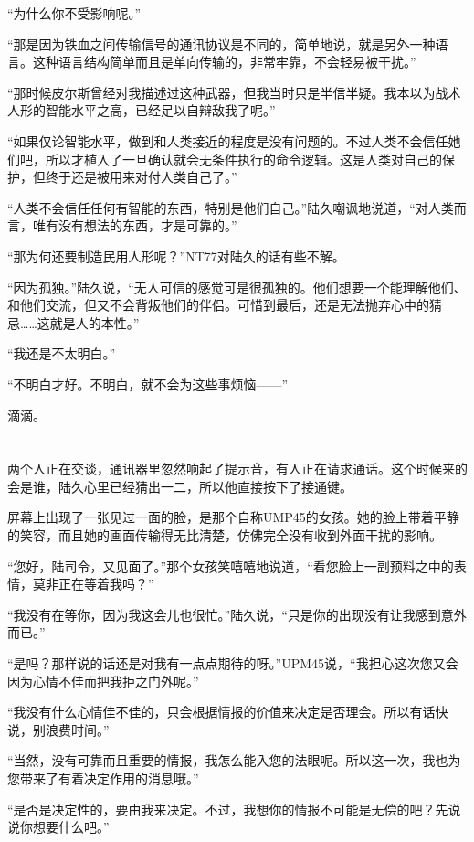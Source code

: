 “为什么你不受影响呢。”

“那是因为铁血之间传输信号的通讯协议是不同的，简单地说，就是另外一种语言。这种语言结构简单而且是单向传输的，非常牢靠，不会轻易被干扰。”

“那时候皮尔斯曾经对我描述过这种武器，但我当时只是半信半疑。我本以为战术人形的智能水平之高，已经足以自辩敌我了呢。”

“如果仅论智能水平，做到和人类接近的程度是没有问题的。不过人类不会信任她们吧，所以才植入了一旦确认就会无条件执行的命令逻辑。这是人类对自己的保护，但终于还是被用来对付人类自己了。”

“人类不会信任任何有智能的东西，特别是他们自己。”陆久嘲讽地说道，“对人类而言，唯有没有想法的东西，才是可靠的。”

“那为何还要制造民用人形呢？”NT77对陆久的话有些不解。

“因为孤独。”陆久说，“无人可信的感觉可是很孤独的。他们想要一个能理解他们、和他们交流，但又不会背叛他们的伴侣。可惜到最后，还是无法抛弃心中的猜忌……这就是人的本性。”

“我还是不太明白。”

“不明白才好。不明白，就不会为这些事烦恼——”

滴滴。

\section*{}

两个人正在交谈，通讯器里忽然响起了提示音，有人正在请求通话。这个时候来的会是谁，陆久心里已经猜出一二，所以他直接按下了接通键。

屏幕上出现了一张见过一面的脸，是那个自称UMP45的女孩。她的脸上带着平静的笑容，而且她的画面传输得无比清楚，仿佛完全没有收到外面干扰的影响。

“您好，陆司令，又见面了。”那个女孩笑嘻嘻地说道，“看您脸上一副预料之中的表情，莫非正在等着我吗？”

“我没有在等你，因为我这会儿也很忙。”陆久说，“只是你的出现没有让我感到意外而已。”

“是吗？那样说的话还是对我有一点点期待的呀。”UPM45说，“我担心这次您又会因为心情不佳而把我拒之门外呢。”

“我没有什么心情佳不佳的，只会根据情报的价值来决定是否理会。所以有话快说，别浪费时间。”

“当然，没有可靠而且重要的情报，我怎么能入您的法眼呢。所以这一次，我也为您带来了有着决定作用的消息哦。”

“是否是决定性的，要由我来决定。不过，我想你的情报不可能是无偿的吧？先说说你想要什么吧。”

